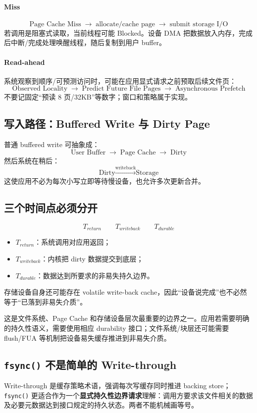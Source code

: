 \documentclass[11pt,a4paper]{ctexart}
\newcommand{\kw}[1]{\textbf{#1}}
\newcommand{\code}[1]{\texttt{#1}}
\newcommand{\arr}{\;\longrightarrow\;}
\begin{document}
\paragraph{Miss}
\[
\text{Page Cache Miss}\arr\text{allocate/cache page}\arr\text{submit storage I/O}
\]
若调用是阻塞式读取，当前线程可能 Blocked。设备 DMA 把数据放入内存，完成后中断/完成处理唤醒线程，随后复制到用户 buffer。

\paragraph{Read-ahead}
系统观察到顺序/可预测访问时，可能在应用显式请求之前预取后续文件页：
\[
\boxed{\text{Observed Locality}\arr\text{Predict Future File Pages}\arr\text{Asynchronous Prefetch}}
\]
不要记固定“预读 8 页/32KB”等数字；窗口和策略属于实现。

\subsection{写入路径：Buffered Write 与 Dirty Page}
普通 buffered write 可抽象成：
\[
\text{User Buffer}\arr\text{Page Cache}\arr\text{Dirty}
\]
然后系统在稍后：
\[
\text{Dirty}\xrightarrow{\text{writeback}}\text{Storage}
\]
这使应用不必为每次小写立即等待慢设备，也允许多次更新合并。

\subsection{三个时间点必须分开}
\[
\boxed{T_{return}}
\qquad
\boxed{T_{writeback}}
\qquad
\boxed{T_{durable}}
\]
\begin{itemize}
  \item $T_{return}$：系统调用对应用返回；
  \item $T_{writeback}$：内核把 dirty 数据提交到底层；
  \item $T_{durable}$：数据达到所要求的非易失持久边界。
\end{itemize}
存储设备自身还可能存在 volatile write-back cache，因此“设备说完成”也不必然等于“已落到非易失介质”。

\begin{warn}[\code{write()} 成功返回不等于持久化完成]
这是文件系统、Page Cache 和存储设备层次最重要的边界之一。应用若需要明确的持久性语义，需要使用相应 durability 接口；文件系统/块层还可能需要 flush/FUA 等机制把设备易失缓存推进到非易失介质。
\end{warn}

\subsection{\code{fsync()} 不是简单的 Write-through}
Write-through 是缓存策略术语，强调每次写缓存同时推进 backing store；\code{fsync()} 更适合作为一个\kw{显式持久性边界请求}理解：调用方要求该文件相关的数据及必要元数据达到接口规定的持久状态。两者不能机械画等号。
\end{document}
